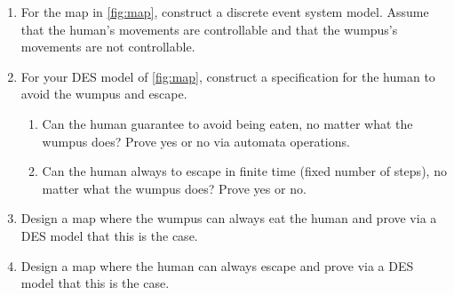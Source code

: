 \documentclass[12pt,letterpaper]{ntdhw}
\begin{document}
\begin{enumerate}

  \item For the map in \ref{fig:map}, construct a discrete event
  system model.  Assume that the human's movements are controllable
  and that the wumpus's movements are not controllable.

  \item For your DES model of \ref{fig:map}, construct a specification
  for the human to avoid the wumpus and escape.
  \begin{enumerate}
    \item Can the human guarantee to avoid being eaten, no matter what
    the wumpus does?  Prove yes or no via automata operations.
    \item Can the human always to escape in finite time (fixed
    number of steps), no matter what the wumpus does?  Prove yes or
    no.
  \end{enumerate}

  \item Design a map where the wumpus can always eat the human and
  prove via a DES model that this is the case.

  \item Design a map where the human can always escape and prove via a
  DES model that this is the case.

\end{enumerate}
\end{document}
